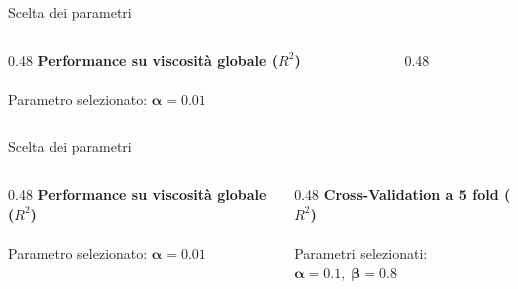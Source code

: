 \documentclass[10pt, aspectratio=169, table]{beamer}
\begin{document}
\begin{frame}{Scelta dei parametri}
	\begin{columns}[c]
		\begin{column}{0.48\textwidth}
			\centering
			{\footnotesize\bfseries Performance su viscosità globale ($R^2$)} \\[0.15cm]
			 \\[0.1cm]
			{\footnotesize Parametro selezionato: $\bm{\alpha = 0.01}$}
		\end{column}
		\begin{column}{0.48\textwidth}
		\end{column}
	\end{columns}
\end{frame}

\begin{frame}[noframenumbering]{Scelta dei parametri}
	\begin{columns}[c]
		\begin{column}{0.48\textwidth}
			\centering
			{\footnotesize\bfseries Performance su viscosità globale ($R^2$)} \\[0.15cm]
			 \\[0.1cm]
			{\footnotesize Parametro selezionato: $\bm{\alpha = 0.01}$}
		\end{column}
		\begin{column}{0.48\textwidth}
			\centering
			{\footnotesize\bfseries Cross-Validation a 5 fold ($R^2$)} \\[0.15cm]
			 \\[0.2cm]
			{\footnotesize Parametri selezionati: $\bm{\alpha = 0.1,\; \beta = 0.8}$}
		\end{column}
	\end{columns}
\end{frame}
	
\end{document}
